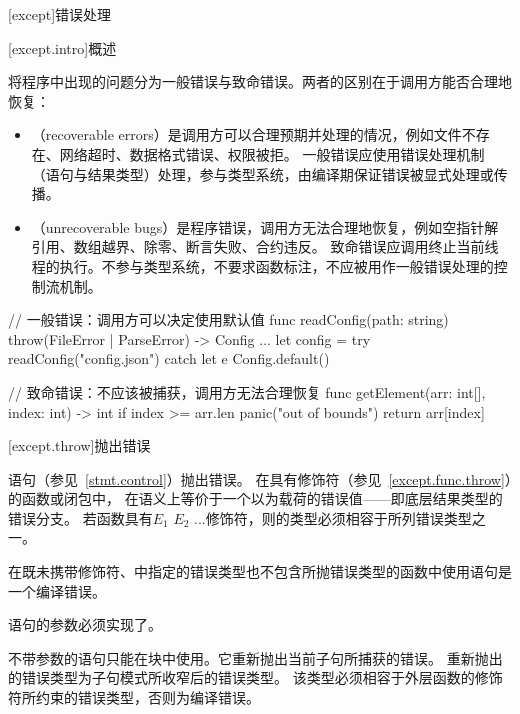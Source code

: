 
[except]{错误处理}

[except.intro]{概述}

\pnum
\X 将程序中出现的问题分为一般错误与致命错误。两者的区别在于调用方能否合理地恢复：

\begin{itemize}
\item
{}（recoverable errors）是调用方可以合理预期并处理的情况，例如文件不存在、网络超时、数据格式错误、权限被拒。
一般错误应使用错误处理机制（语句与结果类型）处理，参与类型系统，由编译期保证错误被显式处理或传播。
\item
{}（unrecoverable bugs）是程序错误，调用方无法合理地恢复，例如空指针解引用、数组越界、除零、断言失败、合约违反。
致命错误应调用终止当前线程的执行。不参与类型系统，不要求函数标注，不应被用作一般错误处理的控制流机制。
\end{itemize}

\pnum
\enterexample
\begin{codeblock}
// 一般错误：调用方可以决定使用默认值
func readConfig(path: string) throw(FileError | ParseError) -> Config { ... }
let config = try readConfig("config.json") catch let e { Config.default() }

// 致命错误：不应该被捕获，调用方无法合理恢复
func getElement(arr: int[], index: int) -> int {
    if index >= arr.len { panic("out of bounds") }
    return arr[index]
}
\end{codeblock}
\exitexample

[except.throw]{抛出错误}

\pnum
{}语句（参见~\ref{stmt.control}）抛出错误。
在具有修饰符（参见~\ref{except.func.throw}）的函数或闭包中，
在语义上等价于一个以为载荷的错误值——即底层结果类型的错误分支。
若函数具有$E_1$\tcode{,} $E_2$\tcode{,} ...\tcode{)}修饰符，则的类型必须相容于所列错误类型之一。

\pnum
在既未携带修饰符、中指定的错误类型也不包含所抛错误类型的函数中使用语句是一个编译错误。

\pnum
{}语句的参数必须实现了。

\pnum
不带参数的语句只能在块中使用。它重新抛出当前子句所捕获的错误。
重新抛出的错误类型为子句模式所收窄后的错误类型。
该类型必须相容于外层函数的修饰符所约束的错误类型，否则为编译错误。

